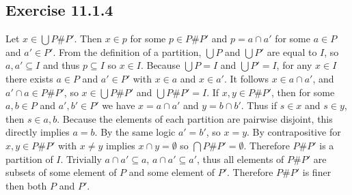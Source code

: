 \documentclass{article}
\theoremstyle{plain}
\theoremstyle{definition}
\begin{document}
\subsection*{Exercise 11.1.4}
Let \(x\in \bigcup P\#P'\). Then \(x\in p\) for some \(p\in P\#P'\) and \(p=a\cap a'\) for some \(a\in P\) and \(a'\in P'\). From the definition of a partition, \(\bigcup P\) and \(\bigcup P'\) are equal to \(I\), so \(a,a'\subseteq I\) and thus \(p\subseteq I\) so \(x\in I\). Because \(\bigcup P=I\) and \(\bigcup P'=I\), for any \(x\in I\) there exists \(a\in P\) and \(a'\in P'\) with \(x\in a\) and \(x\in a'\). It follows \(x\in a\cap a'\), and \(a'\cap a\in P\#P'\), so \(x\in\bigcup P\#P'\) and \(\bigcup P\#P'=I\).\medbreak
If \(x,y\in P\#P'\), then for some \(a,b\in P\) and \(a',b'\in P'\) we have \(x=a\cap a'\) and \(y=b\cap b'\). Thus if \(s\in x\) and \(s\in y\), then \(s\in a,b\). Because the elements of each partition are pairwise disjoint, this directly implies \(a=b\). By the same logic \(a'=b'\), so \(x=y\). By contrapositive for \(x,y\in P\#P'\) with \(x\neq y\) implies \(x\cap y=\emptyset\) so \(\bigcap P\#P'=\emptyset\). Therefore \(P\#P'\) is a partition of \(I\). Trivially \(a\cap a'\subseteq a\), \(a\cap a'\subseteq a'\), thus all elements of \(P\#P'\) are subsets of some element of \(P\) and some element of \(P'\). Therefore \(P\#P'\) is finer then both \(P\) and \(P'\).
\clearpage
\end{document}
